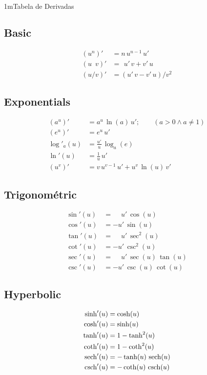 \documentclass["AM3C-Slides_annotations.tex"]{subfiles}
\begin{document}
\begin{sectionBox}1m{Tabela de Derivadas} %
  \begin{multicols}{2}

    \subsection*{Basic}
    \begin{align}
        \left(u^n\right)'     &= n\,u^{n-1}\,u'
      \\ \left(u\phantom{/}v\right)' &= \phantom{(}u'\,v + v'\,u
      \\ \left(u/v\right)'    &=   \left(  u'\,v - v'\,u\right)/v^2
    \end{align}

    \subsection*{Exponentials}
    \begin{align}
         \left(a^u\right)'&= a^u\,\ln(a)\,u'; \qquad (a>0 \land a\neq1) 
      \\ \left(e^u\right)'&= e^u\,u' 
      \\ \log'_{a} (u)    &= \frac{u'}{u}\,\log_{a}(e) 
      \\ \ln'(u)          &= \frac{1}{u}\,u' 
      \\ (u^v)'           &= v\,u^{v-1}\,u' + u^v\,\ln(u)\,v' 
    \end{align}

    \subsection*{Trigonométric}
    \begin{align}
         \sin'(u)&= \phantom{-}u'\,\cos(u) 
      \\ \cos'(u)&=   - u'\,\sin(u) 
      \\ \tan'(u)&= \phantom{-}u'\,\sec^2(u) 
      \\ \cot'(u)&=   - u'\,\csc^2(u) 
      \\ \sec'(u)&= \phantom{-}u'\,\sec(u)\,\tan(u) 
      \\ \csc'(u)&=   - u'\,\csc(u)\,\cot(u) 
    \end{align}

    \subsection*{Hyperbolic}
    \begin{align}
        \sinh'(u)&= \cosh(u) 
      \\ \cosh'(u)&= \sinh(u) 
      \\ \tanh'(u)&= 1-\tanh^2(u) 
      \\ \coth'(u)&= 1-\coth^2(u) 
      \\ \operatorname{sech}'(u)&= -\tanh(u)\,\operatorname{sech}(u) 
      \\ \operatorname{csch}'(u)&= -\coth(u)\,\operatorname{csch}(u) 
    \end{align}


\end{multicols}
\end{sectionBox}
\end{document}
